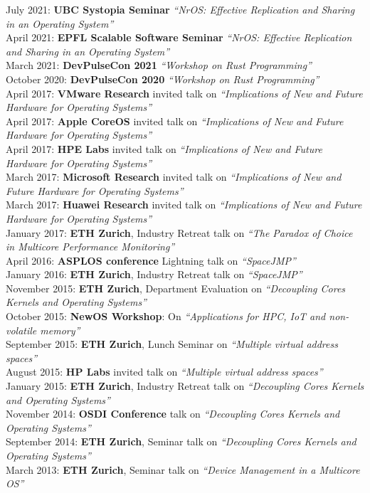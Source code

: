 \documentclass[margin,line]{cv/cv}
\begin{document}
\begin{resume}
    July 2021: \textbf{UBC Systopia Seminar} \textit{``NrOS: Effective Replication and Sharing in an Operating System''}\\
    April 2021: \textbf{EPFL Scalable Software Seminar} \textit{``NrOS: Effective Replication and Sharing in an Operating System''}\\
    March 2021: \textbf{DevPulseCon 2021} \textit{``Workshop on Rust Programming''}\\
    October 2020: \textbf{DevPulseCon 2020} \textit{``Workshop on Rust Programming''}\\
    April 2017: \textbf{VMware Research} invited talk on \textit{``Implications of New and Future Hardware for Operating Systems''}\\
    April 2017: \textbf{Apple CoreOS} invited talk on \textit{``Implications of New and Future Hardware for Operating Systems''}\\
    April 2017: \textbf{HPE Labs} invited talk on \textit{``Implications of New and Future Hardware for Operating Systems''}\\
    March 2017: \textbf{Microsoft Research} invited talk on \textit{``Implications of New and Future Hardware for Operating Systems''}\\
    March 2017: \textbf{Huawei Research} invited talk on \textit{``Implications of New and Future Hardware for Operating Systems''}\\
    January 2017: \textbf{ETH Zurich}, Industry Retreat talk on \textit{``The Paradox of Choice in Multicore Performance Monitoring''}\\
    April 2016: \textbf{ASPLOS conference} Lightning talk on \textit{``SpaceJMP''}\\
    January 2016: \textbf{ETH Zurich}, Industry Retreat talk on \textit{``SpaceJMP''}\\
    November 2015: \textbf{ETH Zurich}, Department Evaluation on \textit{``Decoupling Cores Kernels and Operating Systems''}\\
    October 2015: \textbf{NewOS Workshop}: On \textit{``Applications for HPC, IoT and non-volatile memory''}\\
    September 2015: \textbf{ETH Zurich}, Lunch Seminar on \textit{``Multiple virtual address spaces''}\\
    August 2015: \textbf{HP Labs} invited talk on \textit{``Multiple virtual address spaces''}\\
    January 2015: \textbf{ETH Zurich}, Industry Retreat talk on \textit{``Decoupling Cores Kernels and Operating Systems''}\\
    November 2014: \textbf{OSDI Conference} talk on \textit{``Decoupling Cores Kernels and Operating Systems''}\\
    September 2014: \textbf{ETH Zurich}, Seminar talk on \textit{``Decoupling Cores Kernels and Operating Systems''}\\
    March 2013: \textbf{ETH Zurich}, Seminar talk on \textit{``Device Management in a Multicore OS''}\\


\end{resume}
\end{document}
